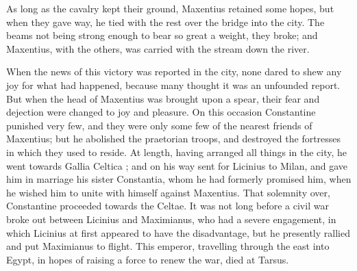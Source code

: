 As long as the cavalry kept their ground, Maxentius retained some hopes, but when they gave way, he tied with the rest over the bridge into the city. The beams not being strong enough to bear so great a weight, they broke; and Maxentius, with the others, was carried with the stream down the river.

When the news of this victory was reported in the city, none dared to shew any joy for what had happened, because many thought it was an unfounded report. But when the head of Maxentius was brought upon a spear, their fear and dejection were changed to joy and pleasure. On this occasion Constantine punished very few, and they were only some few of the nearest friends of Maxentius; but he abolished the praetorian troops, and destroyed the fortresses in which they used to reside. At length, having arranged all things in the city, he went towards Gallia Celtica ; and on his way sent for Licinius to Milan, and gave him in marriage his sister Constantia, whom he had formerly promised him, when he wished him to unite with himself against Maxentius. That solemnity over, Constantine proceeded towards the Celtae. It was not long before a civil war broke out between Licinius and Maximianus, who had a severe engagement, in which Licinius at first appeared to have the disadvantage, but he presently rallied and put Maximianus to flight. This emperor, travelling through the east into Egypt, in hopes of raising a force to renew the war, died at Tarsus.

